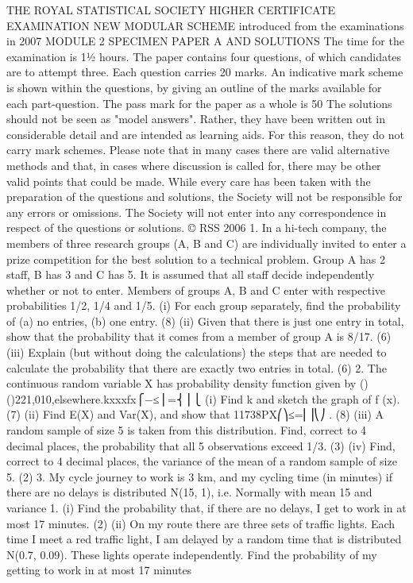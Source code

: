 THE ROYAL STATISTICAL SOCIETY
HIGHER CERTIFICATE EXAMINATION
NEW MODULAR SCHEME
introduced from the examinations in 2007
MODULE 2
SPECIMEN PAPER A
AND SOLUTIONS
The time for the examination is 1½ hours. The paper contains four questions, of which candidates are to attempt three. Each question carries 20 marks. An indicative mark scheme is shown within the questions, by giving an outline of the marks available for each part-question. The pass mark for the paper as a whole is 50%
The solutions should not be seen as "model answers". Rather, they have been written out in considerable detail and are intended as learning aids. For this reason, they do not carry mark schemes. Please note that in many cases there are valid alternative methods and that, in cases where discussion is called for, there may be other valid points that could be made.
While every care has been taken with the preparation of the questions and solutions, the Society will not be responsible for any errors or omissions.
The Society will not enter into any correspondence in respect of the questions or solutions.
© RSS 2006
1. In a hi-tech company, the members of three research groups (A, B and C) are individually invited to enter a prize competition for the best solution to a technical problem. Group A has 2 staff, B has 3 and C has 5. It is assumed that all staff decide independently whether or not to enter. Members of groups A, B and C enter with respective probabilities 1/2, 1/4 and 1/5.
(i) For each group separately, find the probability of (a) no entries, (b) one entry.
(8)
(ii) Given that there is just one entry in total, show that the probability that it comes from a member of group A is 8/17.
(6)
(iii) Explain (but without doing the calculations) the steps that are needed to calculate the probability that there are exactly two entries in total.
(6)
2. The continuous random variable X has probability density function given by
()()221,010,elsewhere.kxxxfx⎧−≤⎪=⎨⎪⎩
(i) Find k and sketch the graph of f (x).
(7)
(ii) Find E(X) and Var(X), and show that 11738PX⎛⎞≤=⎜⎟⎝⎠ .
(8)
(iii) A random sample of size 5 is taken from this distribution. Find, correct to 4 decimal places, the probability that all 5 observations exceed 1/3.
(3)
(iv) Find, correct to 4 decimal places, the variance of the mean of a random sample of size 5.
(2)
3. My cycle journey to work is 3 km, and my cycling time (in minutes) if there are no delays is distributed N(15, 1), i.e. Normally with mean 15 and variance 1.
(i) Find the probability that, if there are no delays, I get to work in at most 17 minutes.
(2)
(ii) On my route there are three sets of traffic lights. Each time I meet a red traffic light, I am delayed by a random time that is distributed N(0.7, 0.09). These lights operate independently. Find the probability of my getting to work in at most 17 minutes
